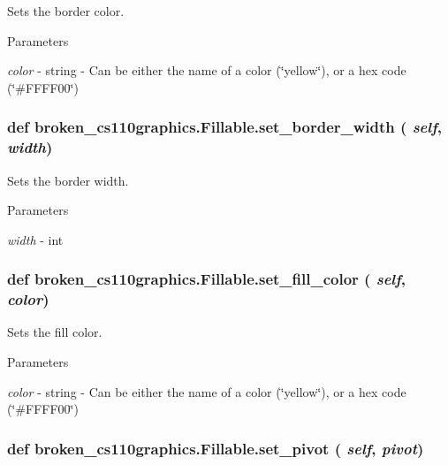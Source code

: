 Sets the border color. 
\begin{DoxyParams}{Parameters}
\item[{\em color}]-\/ string -\/ Can be either the name of a color (\char`\"{}yellow\char`\"{}), or a hex code (\char`\"{}\#FFFF00\char`\"{}) \end{DoxyParams}
\hypertarget{classbroken__cs110graphics_1_1Fillable_aa64f7079bd985ed884bf1d066dfc47af}{
\subsubsection[{set\_\-border\_\-width}]{\setlength{\rightskip}{0pt plus 5cm}def broken\_\-cs110graphics.Fillable.set\_\-border\_\-width ( {\em self}, \/   {\em width})}}
\label{classbroken__cs110graphics_1_1Fillable_aa64f7079bd985ed884bf1d066dfc47af}


Sets the border width. 
\begin{DoxyParams}{Parameters}
\item[{\em width}]-\/ int \end{DoxyParams}
\hypertarget{classbroken__cs110graphics_1_1Fillable_a4187eab5130ba740b796270680114d94}{
\subsubsection[{set\_\-fill\_\-color}]{\setlength{\rightskip}{0pt plus 5cm}def broken\_\-cs110graphics.Fillable.set\_\-fill\_\-color ( {\em self}, \/   {\em color})}}
\label{classbroken__cs110graphics_1_1Fillable_a4187eab5130ba740b796270680114d94}


Sets the fill color. 
\begin{DoxyParams}{Parameters}
\item[{\em color}]-\/ string -\/ Can be either the name of a color (\char`\"{}yellow\char`\"{}), or a hex code (\char`\"{}\#FFFF00\char`\"{}) \end{DoxyParams}
\hypertarget{classbroken__cs110graphics_1_1Fillable_a3da844c8f1db21d0f0b95d6a66a3e18b}{
\subsubsection[{set\_\-pivot}]{\setlength{\rightskip}{0pt plus 5cm}def broken\_\-cs110graphics.Fillable.set\_\-pivot ( {\em self}, \/   {\em pivot})}}
\label{classbroken__cs110graphics_1_1Fillable_a3da844c8f1db21d0f0b95d6a66a3e18b}


